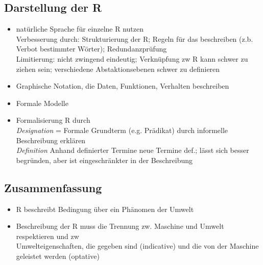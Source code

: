 \subsection{Darstellung der R}
\begin{itemize}
	\item natürliche Sprache für einzelne R nutzen\\
	Verbesserung durch: Strukturierung der R; Regeln für das beschreiben (z.b. Verbot bestimmter Wörter); Redundanzprüfung\\
	Limitierung: nicht zwingend eindeutig; Verknüpfung zw R kann schwer zu ziehen sein; verschiedene Abstaktionsebenen schwer zu definieren
	\item Graphische Notation, die Daten, Funktionen, Verhalten beschreiben
	\item Formale Modelle
	\item Formalisierung R durch\\
	\textit{Designation} = Formale Grundterm (e.g. Prädikat) durch informelle Beschreibung erklären\\
	\textit{Definition} Anhand definierter Termine neue Termine def.; lässt sich besser begründen, aber ist eingeschränkter in der Beschreibung
	
\end{itemize}

\subsection{Zusammenfassung}
\begin{itemize}
	\item R beschreibt Bedingung über ein Phänomen der Umwelt
	\item Beschreibung der R muss die Trennung zw. Maschine und Umwelt respektieren und zw\\
	Umwelteigenschaften, die gegeben sind (indicative) und die von der Maschine geleistet werden (optative)
\end{itemize}
